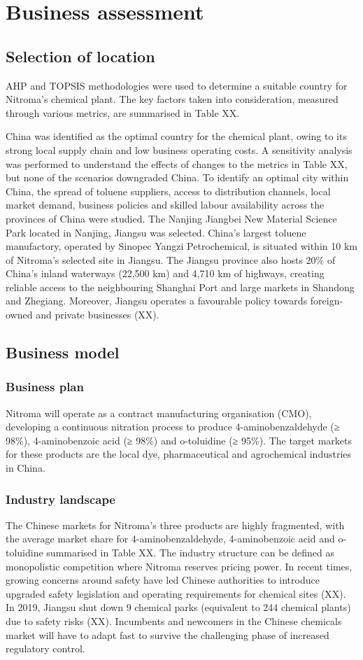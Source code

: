 \section{Business assessment}
\label{sec:economics}
\subsection{Selection of location} 
AHP and TOPSIS methodologies were used to determine a suitable country for Nitroma’s chemical plant. The key factors taken into consideration, measured through various metrics, are summarised in Table XX.

China was identified as the optimal country for the chemical plant, owing to its strong local supply chain and low business operating costs. A sensitivity analysis was performed to understand the effects of changes to the metrics in Table XX, but none of the scenarios downgraded China. To identify an optimal city within China, the spread of toluene suppliers, access to distribution channels, local market demand, business policies and skilled labour availability across the provinces of China were studied. The Nanjing Jiangbei New Material Science Park located in Nanjing, Jiangsu was selected. China’s largest toluene manufactory, operated by Sinopec Yangzi Petrochemical, is situated within 10 km of Nitroma’s selected site in Jiangsu. The Jiangsu province also hosts 20\% of China’s inland waterways (22,500 km) and 4,710 km of highways, creating reliable access to the neighbouring Shanghai Port and large markets in Shandong and Zhegiang. Moreover, Jiangsu operates a favourable policy towards foreign-owned and private businesses (XX). 

\subsection{Business model} 
\subsubsection{Business plan}
Nitroma will operate as a contract manufacturing organisation (CMO), developing a continuous nitration process to produce 4-aminobenzaldehyde (≥ 98\%), 4-aminobenzoic acid (≥ 98\%) and o-toluidine (≥ 95\%). The target markets for these products are the local dye, pharmaceutical and agrochemical industries in China.
\subsubsection{Industry landscape}
The Chinese markets for Nitroma’s three products are highly fragmented, with the average market share for 4-aminobenzaldehyde, 4-aminobenzoic acid and o-toluidine summarised in Table XX. The industry structure can be defined as monopolistic competition where Nitroma reserves pricing power. In recent times, growing concerns around safety have led Chinese authorities to introduce upgraded safety legislation and operating requirements for chemical sites (XX). In 2019, Jiangsu shut down 9 chemical parks (equivalent to 244 chemical plants) due to safety risks (XX). Incumbents and newcomers in the Chinese chemicals market will have to adapt fast to survive the challenging phase of increased regulatory control. 
